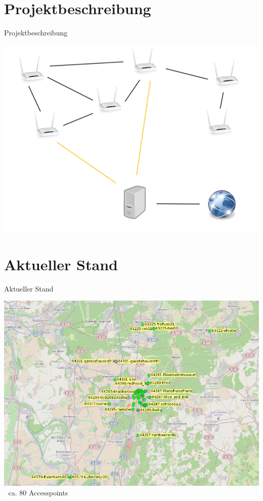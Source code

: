 \documentclass{beamer}
\begin{document}
\section{Projektbeschreibung}
\begin{frame}{Projektbeschreibung}
\vfill
\begin{center}
\includegraphics[height=0.7\textheight]{images/meshing}
\end{center}
\vfill
\end{frame}

\section{Aktueller Stand}
\begin{frame}{Aktueller Stand}
\vfill
\begin{center}
\includegraphics[height=0.75\textheight]{images/2015-01-26-map}$\;$
\vfill
ca. 80 Accesspoints
\end{center}
\end{frame}
\end{document}
